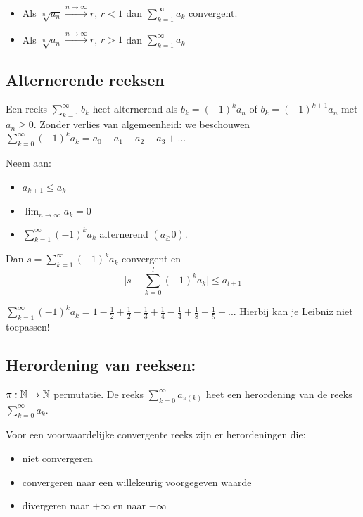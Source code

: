 \documentclass[week=1]{homework}
\begin{document}
	\Gevolg \begin{itemize}
		\item Als $\sqrt[n]{a_n} \xrightarrow{n \rightarrow \infty} r$, $r < 1$ dan $\sum_{k=1}^{\infty} a_k$ convergent. 
		\item Als $\sqrt[n]{a_n} \xrightarrow{n \rightarrow \infty} r$, $r > 1$ dan $\sum_{k=1}^{\infty} a_k$
	\end{itemize}
	
	\subsection*{Alternerende reeksen}
	\Def Een reeks $\sum_{k=1}^{\infty} b_k$ heet alternerend als $b_k = (-1)^k a_n$ of $b_k = (-1)^{k+1} a_n$ met $a_n \ge 0$. Zonder verlies van algemeenheid: we beschouwen $\sum_{k=0}^{\infty} (-1)^k a_k = a_0 - a_1 + a_2 - a_3 + ...$
	
	 Neem aan: \begin{itemize}
		\item $a_{k+1} \le a_k$ 
		\item $\lim_{n \rightarrow \infty} a_k = 0$
		\item $\sum_{k=1}^{\infty} (-1)^k a_k$ alternerend $(a_ \ge 0)$.
	\end{itemize}
	Dan $s =  \sum_{k=1}^{\infty} (-1)^k a_k$ convergent en 
	\[
		\mid s - \sum_{k=0}^{l} (-1)^k a_k \mid \le a_{l+1}
	\]
	
	\Letop $\sum_{k=1}^{\infty} (-1)^k a_k = 1 - \frac{1}{2} + \frac{1}{2} - \frac{1}{3} + \frac{1}{4} - \frac{1}{4} + \frac{1}{8} - \frac{1}{5} + ...$ Hierbij kan je Leibniz niet toepassen!
	
	\subsection*{Herordening van reeksen:}
	\Def $\pi: \mathbb{N} \rightarrow \mathbb{N}$ permutatie. De reeks $\sum_{k=0}^{\infty} a_{\pi(k)}$ heet een herordening van de reeks $\sum_{k=0}^{\infty} a_k$. 
	
	\Letop Voor een voorwaardelijke convergente reeks zijn er herordeningen die: 
	\begin{itemize}
		\item niet convergeren 
		\item convergeren naar een willekeurig voorgegeven waarde
		\item divergeren naar $+ \infty$ en naar $- \infty$
	\end{itemize}
	
\end{document}
